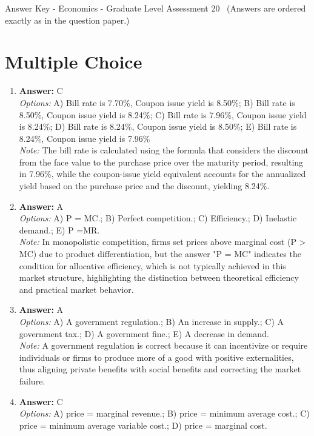 \documentclass[12pt]{article}
\begin{document}
\begin{center}
Answer Key - Economics - Graduate Level Assessment 20 \
\small (Answers are ordered exactly as in the question paper.)
\end{center}

\section*{Multiple Choice}
\begin{enumerate}[label=\arabic*.]
\item \textbf{Answer:} C
\\ \textit{Options:} A) Bill rate is 7.70\%, Coupon issue yield is 8.50\%; B) Bill rate is 8.50\%, Coupon issue yield is 8.24\%; C) Bill rate is 7.96\%, Coupon issue yield is 8.24\%; D) Bill rate is 8.24\%, Coupon issue yield is 8.50\%; E) Bill rate is 8.24\%, Coupon issue yield is 7.96\%
\\ \textit{Note:} The bill rate is calculated using the formula that considers the discount from the face value to the purchase price over the maturity period, resulting in 7.96\%, while the coupon-issue yield equivalent accounts for the annualized yield based on the purchase price and the discount, yielding 8.24\%.
\item \textbf{Answer:} A
\\ \textit{Options:} A) P = MC.; B) Perfect competition.; C) Efficiency.; D) Inelastic demand.; E) P =MR.
\\ \textit{Note:} In monopolistic competition, firms set prices above marginal cost (P \textgreater{} MC) due to product differentiation, but the answer "P = MC" indicates the condition for allocative efficiency, which is not typically achieved in this market structure, highlighting the distinction between theoretical efficiency and practical market behavior.
\item \textbf{Answer:} A
\\ \textit{Options:} A) A government regulation.; B) An increase in supply.; C) A government tax.; D) A government fine.; E) A decrease in demand.
\\ \textit{Note:} A government regulation is correct because it can incentivize or require individuals or firms to produce more of a good with positive externalities, thus aligning private benefits with social benefits and correcting the market failure.
\item \textbf{Answer:} C
\\ \textit{Options:} A) price = marginal revenue.; B) price = minimum average cost.; C) price = minimum average variable cost.; D) price = marginal cost.

\end{enumerate}
\end{document}
